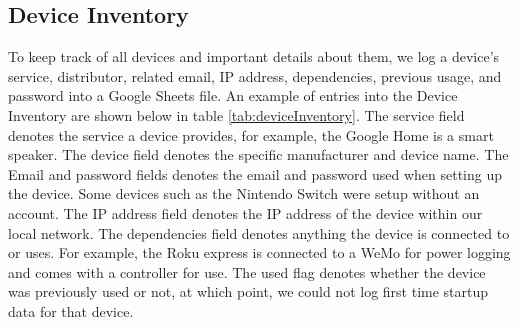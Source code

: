 \subsection{Device Inventory}
\label{Device Inventory}
To keep track of all devices and important details about them, we log a device's service, distributor, related email, IP address, dependencies, previous usage, and password into a Google Sheets file. An example of entries into the Device Inventory are shown below in table \ref{tab:deviceInventory}. The service field denotes the service a device provides, for example, the Google Home is a smart speaker. The device field denotes the specific manufacturer and device name. The Email and password fields denotes the email and password used when setting up the device. Some devices such as the Nintendo Switch were setup without an account. The IP address field denotes the IP address of the device within our local network. The dependencies field denotes anything the device is connected to or uses. For example, the Roku express is connected to a WeMo for power logging and comes with a controller for use. The used flag denotes whether the device was previously used or not, at which point, we could not log first time startup data for that device.

\begin{table}[H]
    \centering
    \caption{Device inventory excerpt. Password column not shown.}
    \label{tab:deviceInventory}
\end{table}


